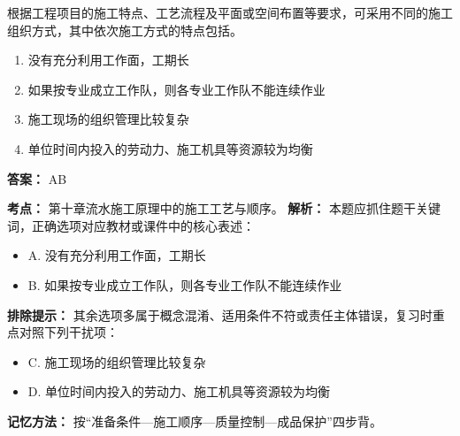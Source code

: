 \documentclass[UTF8,fontset=fandol,11pt]{ctexart}
\begin{document}
\begin{quizbox}[title={第 16 题}]
根据工程项目的施工特点、工艺流程及平面或空间布置等要求，可采用不同的施工组织方式，其中依次施工方式的特点包括。\\
\begin{enumerate}[label=\Alph*.]
\item 没有充分利用工作面，工期长
\item 如果按专业成立工作队，则各专业工作队不能连续作业
\item 施工现场的组织管理比较复杂
\item 单位时间内投入的劳动力、施工机具等资源较为均衡
\end{enumerate}
\textbf{答案：} AB
\vspace{0.25em}
\begin{answerbox}[title={考点解析}]
\textbf{考点：} 第十章流水施工原理中的施工工艺与顺序。
\textbf{解析：} 本题应抓住题干关键词，正确选项对应教材或课件中的核心表述：
\begin{itemize}
\item A. 没有充分利用工作面，工期长
\item B. 如果按专业成立工作队，则各专业工作队不能连续作业
\end{itemize}
\textbf{排除提示：} 其余选项多属于概念混淆、适用条件不符或责任主体错误，复习时重点对照下列干扰项：
\begin{itemize}
\item C. 施工现场的组织管理比较复杂
\item D. 单位时间内投入的劳动力、施工机具等资源较为均衡
\end{itemize}
\textbf{记忆方法：} 按“准备条件—施工顺序—质量控制—成品保护”四步背。
\end{answerbox}
\end{quizbox}

\vspace{0.2em}
\end{document}
